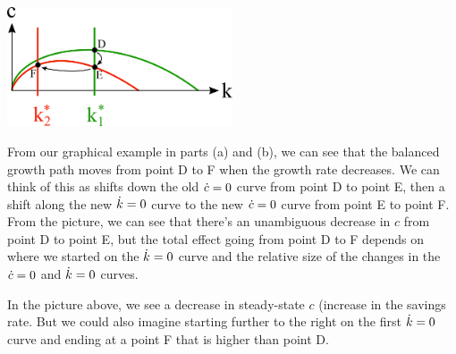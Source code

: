 \documentclass[12pt]{article}
\begin{document}
\includegraphics[width=0.5\textwidth]{1.g}

From our graphical example in parts (a) and (b), we can see that the balanced growth path moves from point D to F when the growth rate decreases. We can think of this as shifts down the old $\dot c=0$ curve from point D to point E, then a shift along the new $\dot k=0$ curve to the new $\dot c=0$ curve from point E to point F. From the picture, we can see that there's an unambiguous decrease in $c$ from point D to point E, but the total effect going from point D to F depends on where we started on the $\dot k=0$ curve and the relative size of the changes in the $\dot c=0$ and $\dot k=0$ curves.

In the picture above, we see a decrease in steady-state $c$ (increase in the savings rate. But we could also imagine starting further to the right on the first $\dot k=0$ curve and ending at a point F that is higher than point D.

\newpage{}
\end{document}
